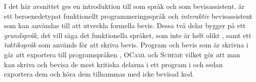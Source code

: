 I det här avsnittet ges en introduktion till \coq{} som språk och som
bevisassistent. \coq{} är ett beroenedetypat funktionellt programmeringsspråk
och \emph{interaktiv} bevisassistent som kan användas till att utveckla
formella bevis. Dessa två delar bygger på ett \emph{grundspråk}, det vill säga
det funktionella språket, som inte är helt olikt \haskell{}, samt ett
\emph{taktikspråk} som används för att skriva bevis. Program och bevis som är
skrivna i \coq{} går att exportera till programspråken \haskell{},
\textsc{OCaml} och \textsc{Scheme} vilket gör att man kan skriva och bevisa de
mest kritiska delarna i ett program i \coq{} och sedan exportera dem och köra
dem tillsammas med icke bevisad kod.
